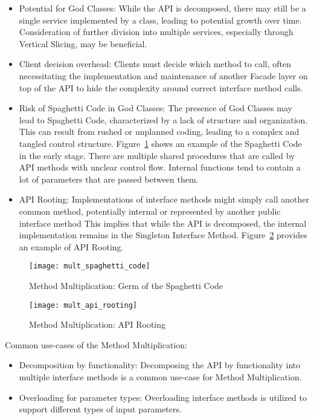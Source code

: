 \begin{itemize}
    \item Potential for God Classes:
    While the API is decomposed, there may still be a single service implemented by a class, leading to potential
    growth over time.
    Consideration of further division into multiple services, especially through Vertical Slicing, may be beneficial.
    \item Client decision overhead:
    Clients must decide which method to call, often necessitating the implementation and maintenance of another
    Facade layer on top of the API to hide the complexity around correct interface method calls.
    \item Risk of Spaghetti Code in God Classes:
    The presence of God Classes may lead to Spaghetti Code, characterized by a lack of structure and organization.
    This can result from rushed or unplanned coding, leading to a complex and tangled control structure.
    Figure~\ref{fig:mult_spaghetti_code} shows an example of the Spaghetti Code in the early stage.
    There are multiple shared procedures that are called by API methods with unclear control flow.
    Internal functions tend to contain a lot of parameters that are passed between them.
    \item API Rooting:
    Implementations of interface methods might simply call another common method, potentially internal or represented
    by another public interface method
    This implies that while the API is decomposed, the internal implementation remains
    in the Singleton Interface Method.
    Figure~\ref{fig:mult_api_rooting} provides an example of API Rooting.
\end{itemize}

\begin{figure}[!htb]
    \centering
    \texttt{[image: mult\_spaghetti\_code]}
    \caption{Method Multiplication: Germ of the Spaghetti Code}
    \label{fig:mult_spaghetti_code}
\end{figure}

\begin{figure}[!htb]
    \centering
    \texttt{[image: mult\_api\_rooting]}
    \caption{Method Multiplication: API Rooting}
    \label{fig:mult_api_rooting}
\end{figure}

Common use-cases of the Method Multiplication:

\begin{itemize}
    \item Decomposition by functionality:
    Decomposing the API by functionality into multiple interface methods is a common use-case for Method Multiplication.
    \item Overloading for parameter types:
    Overloading interface methods is utilized to support different types of input parameters.
\end{itemize}
